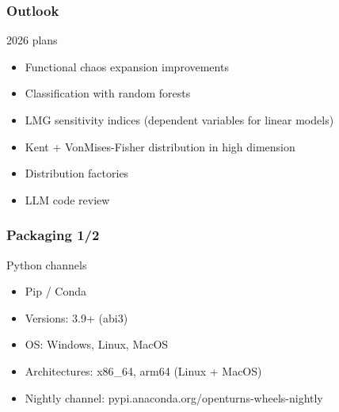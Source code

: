 \documentclass[aspectratio=169]{beamer}
\begin{document}
\begin{frame}
\frametitle{Outlook}
\begin{block}{2026 plans}
\begin{itemize}
\item Functional chaos expansion improvements
\item Classification with random forests
\item LMG sensitivity indices (dependent variables for linear models)
\item Kent + VonMises-Fisher distribution in high dimension
\item Distribution factories
\item LLM code review
\end{itemize}
\end{block}
\end{frame}

\begin{frame}
\frametitle{Packaging 1/2}
\begin{block}{Python channels}
\begin{itemize}
\item Pip / Conda
\item Versions: 3.9+ (abi3)
\item OS: Windows, Linux, MacOS
\item Architectures: x86\_64, arm64 (Linux + MacOS)
\item Nightly channel: pypi.anaconda.org/openturns-wheels-nightly
\end{itemize}
\end{block}


\end{frame}
\end{document}

